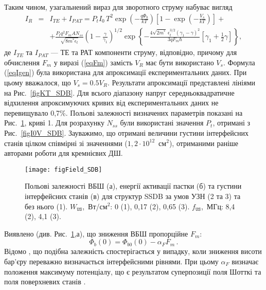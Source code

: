 Таким чином, узагальнений вираз для зворотного струму набуває вигляд
\begin{eqnarray}
\label{eqIgen}
 I_R&=&I_{TE}+I_{P\!AT}=P_tI_0\,T^2\exp\left(-\frac{q\Phi_b}{kT}\right)\left[1-\exp\left(-\frac{V_s}{kT}\right)\right]+\\
 &&+\frac{P_tq^2F_mAN_{ss}}{\sqrt{8m^*\epsilon_t}}\left(1-\frac{\gamma}{\gamma_1}\right)^{1/2}\exp
    \left\{-\frac{4\sqrt{2m^*}\,\epsilon_t^{3/2}\left(\gamma_1-\gamma\right)^2}{3qF_m\hbar}
    [\gamma_1+\frac{1}{2}\gamma]\right\}\nonumber,
\end{eqnarray}
де
$I_{TE}$ та $I_{P\!AT}$ --- ТЕ та РАТ компоненти струму, відповідно,
причому для обчислення $F_m$ у виразі (\ref{eqFm}) замість $V_R$ має бути використано $V_s$.
Формула (\ref{eqIgen}) була використана для апроксимації експериментальних даних.
При цьому вважалося, що $V_s=0.5V_R$.
Результати апроксимації представлені лініями на Рис.~\ref{figKT_SDB}.
Для всього діапазону напруг середньоквадратичне відхилення апроксимуючих кривих від експериментальних даних не перевищувало 0,7\%.
Польові залежності визначених параметрів показані на Рис.~\ref{figField_SDB}, криві 1.
Для розрахунку $N_{ss}$ були використані значення $P_t$, отримані з Рис.~\ref{figI0V_SDB}.
Зауважимо, що отримані величини густини інтерфейсних станів цілком співмірні зі значеннями ($1,2\cdot10^{12}$~см$^{2}$),
отриманими раніше авторами роботи \cite{PipinsFTP} для кремнієвих ДШ.


\begin{figure}
\center
\texttt{[image: figField\_SDB]}
\caption{\label{figField_SDB}
Польові залежності ВБШ (а), енергії активації пастки (б) та густини інтерфейсних станів (в) для структур SSDB за умов УЗН (2 та 3) та без нього (1).
$W_\mathtt{US}$,~Вт/см$^2$: 0 (1), 0,17 (2), 0,65 (3).
$f_\mathtt{US}$,~МГц: 8,4 (2), 4,1 (3).
}%
\end{figure}

Виявлено (див. Рис.~\ref{figField_SDB},а), що зниження ВБШ пропорційне $F_m$:
\begin{equation}\label{eqFbE}
    \Phi_{b}(0)=\Phi_{b0}(0)-\alpha_{F} F_m\,.
\end{equation}
Відомо \cite{Tung:MSE,Rhoderick1988,Em:Parker},
що подібна залежність спостерігається у випадку, коли зниження висоти бар'єру переважно визначається інтерфейсними рівнями.
При цьому  $\alpha_{F}$ визначає положення максимуму потенціалу, що є результатом суперпозиції поля Шотткі та поля поверхневих станів \cite{Em:Parker}.

